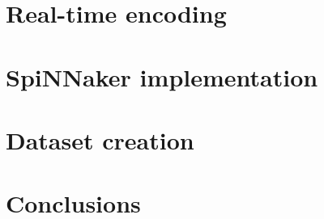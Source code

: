 \section{Real-time encoding}

\section{SpiNNaker implementation}

\section{Dataset creation}

%
\section{Conclusions}
